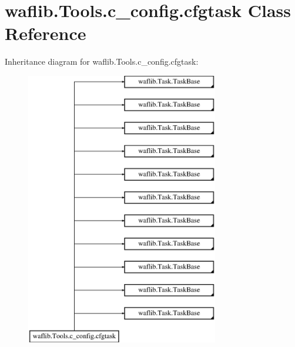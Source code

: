 \hypertarget{classwaflib_1_1_tools_1_1c__config_1_1cfgtask}{}\section{waflib.\+Tools.\+c\+\_\+config.\+cfgtask Class Reference}
\label{classwaflib_1_1_tools_1_1c__config_1_1cfgtask}
Inheritance diagram for waflib.\+Tools.\+c\+\_\+config.\+cfgtask\+:\begin{figure}[H]
\begin{center}
\leavevmode
\includegraphics[height=12.000000cm]{classwaflib_1_1_tools_1_1c__config_1_1cfgtask}
\end{center}
\end{figure}

